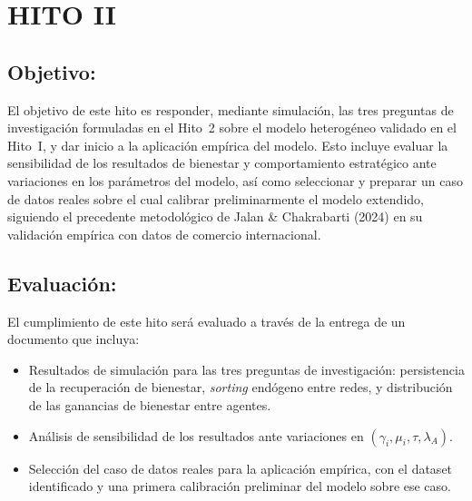 \documentclass[12pt,a4paper]{article}
\begin{document}
\section*{HITO II}

\subsection*{Objetivo:}

El objetivo de este hito es responder, mediante simulaci\'on, las tres preguntas de
investigaci\'on formuladas en el Hito~2 sobre el modelo heterog\'eneo validado en el Hito~I, y
dar inicio a la aplicaci\'on emp\'irica del modelo. Esto incluye evaluar la sensibilidad de los
resultados de bienestar y comportamiento estrat\'egico ante variaciones en los par\'ametros del
modelo, as\'i como seleccionar y preparar un caso de datos reales sobre el cual calibrar
preliminarmente el modelo extendido, siguiendo el precedente metodol\'ogico de Jalan \&
Chakrabarti (2024) en su validaci\'on emp\'irica con datos de comercio internacional.

\subsection*{Evaluaci\'on:}

El cumplimiento de este hito ser\'a evaluado a trav\'es de la entrega de un documento que
incluya:
\begin{itemize}
    \item Resultados de simulaci\'on para las tres preguntas de investigaci\'on: persistencia de
    la recuperaci\'on de bienestar, \emph{sorting} end\'ogeno entre redes, y distribuci\'on de
    las ganancias de bienestar entre agentes.
    \item An\'alisis de sensibilidad de los resultados ante variaciones en
    $(\gamma_i, \mu_i, \tau, \lambda_A)$.
    \item Selecci\'on del caso de datos reales para la aplicaci\'on emp\'irica, con el dataset
    identificado y una primera calibraci\'on preliminar del modelo sobre ese caso.
\end{itemize}
\end{document}
